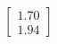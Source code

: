 \documentclass[preview]{standalone}
\begin{document}
\begin{align*}
\begin{bmatrix} 1.70 \\ 1.94 \end{bmatrix}
\end{align*}
\end{document}
